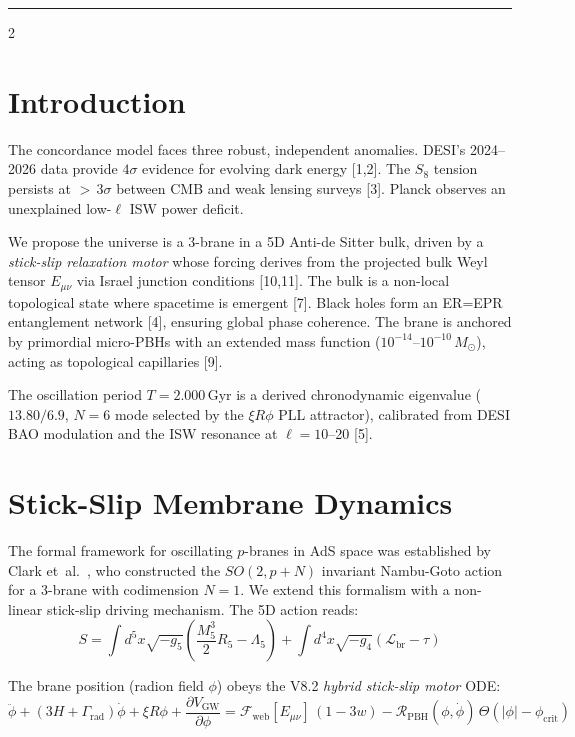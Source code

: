 \documentclass[11pt]{article}
\begin{document}
\vspace{4pt}
\hrule
\vspace{12pt}

\begin{multicols}{2}

\section{Introduction}

The concordance model faces three robust, independent anomalies. DESI's 2024--2026 data provide $4\sigma$ evidence for evolving dark energy [1,2]. The $S_8$ tension persists at ${>}\,3\sigma$ between CMB and weak lensing surveys [3]. Planck observes an unexplained low-$\ell$ ISW power deficit.

We propose the universe is a 3-brane in a 5D Anti-de Sitter bulk, driven by a \textit{stick-slip relaxation motor} whose forcing derives from the projected bulk Weyl tensor $E_{\mu\nu}$ via Israel junction conditions [10,11]. The bulk is a non-local topological state where spacetime is emergent [7]. Black holes form an ER=EPR entanglement network [4], ensuring global phase coherence. The brane is anchored by primordial micro-PBHs with an extended mass function ($10^{-14}$--$10^{-10}\,M_\odot$), acting as topological capillaries [9].

The oscillation period $T = 2.000$\,Gyr is a derived chronodynamic eigenvalue ($13.80/6.9$, $N=6$ mode selected by the $\xi R\phi$ PLL attractor), calibrated from DESI BAO modulation and the ISW resonance at $\ell = 10$--20 [5].

\section{Stick-Slip Membrane Dynamics}

The formal framework for oscillating $p$-branes in AdS space was established by Clark et~al.~\cite{OscBrane}, who constructed the $SO(2,p{+}N)$ invariant Nambu-Goto action for a 3-brane with codimension $N=1$. We extend this formalism with a non-linear stick-slip driving mechanism. The 5D action reads:
\begin{equation}
S = \!\int\! d^5x\sqrt{-g_5}\!\left(\frac{M_5^3}{2}R_5 - \Lambda_5\right) + \!\int\! d^4x\sqrt{-g_4}\!\left(\mathcal{L}_\text{br} - \tau\right)
\end{equation}

The brane position (radion field $\phi$) obeys the V8.2 \textit{hybrid stick-slip motor} ODE:
\begin{equation}
\boxed{\ddot{\phi} + (3H + \Gamma_\text{rad})\dot{\phi} + \xi R\phi + \frac{\partial V_\text{GW}}{\partial\phi} = \mathcal{F}_\text{web}[E_{\mu\nu}]\,(1-3w) - \mathcal{R}_\text{PBH}(\phi,\dot{\phi})\,\Theta(|\phi|-\phi_\text{crit})}
\end{equation}


\end{multicols}
\end{document}

